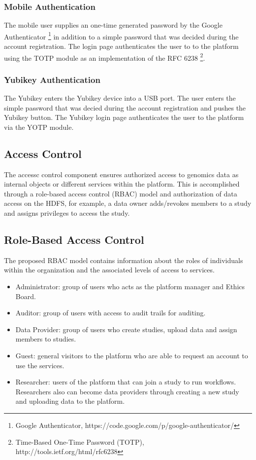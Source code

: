 \subsubsection {Mobile Authentication}
The mobile user supplies an one-time generated password by the Google Authenticator \footnote{Google Authenticator, https://code.google.com/p/google-authenticator/} in addition to a simple password that was decided during the account registration. The login page authenticates the user to to the platform using the TOTP module as an implementation of the RFC 6238 \footnote{Time-Based One-Time Password (TOTP), http://tools.ietf.org/html/rfc6238}.   

\subsubsection {Yubikey Authentication}
The Yubikey enters the Yubikey device into a USB port. The user enters the simple password that was decied during the account registration and pushes the Yubikey button. The Yubikey login page authenticates the user to the platform via the YOTP module.

\subsection {Access Control}
The accessc control component ensures authorized access to genomics data as internal objects or different services within the platform. This is accomplished through a role-based access control (RBAC) model and authorization of data access on the HDFS, for example, a data owner adds/revokes members to a study and assigns privileges to access the study.

\subsection {Role-Based Access Control}

The proposed RBAC model contains information about the roles of individuals within the organization and the associated levels of access to services.

\begin{itemize}
\item Administrator: group of users who acts as the platform manager and Ethics Board.

\item Auditor: group of users with access to audit trails for auditing.

\item Data Provider: group of users who create studies, upload data and assign members to studies.

\item Guest: general visitors to the platform who are able to request an account to use the services.

\item Researcher: users of the platform that can join a study to run workflows. Researchers also can become data providers through creating a new study and uploading data to the platform.

\end{itemize}



